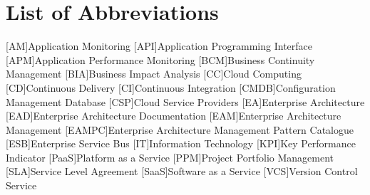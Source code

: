 
\chapter*{List of Abbreviations}

\begin{acronym}[ewuifbwejkbfjksbjkcbsdjcjkn3j]%
[AM]{Application Monitoring}
[API]{Application Programming Interface}
[APM]{Application Performance Monitoring}
[BCM]{Business Continuity Management}
[BIA]{Business Impact Analysis}
[CC]{Cloud Computing}
[CD]{Continuous Delivery}
[CI]{Continuous Integration}
[CMDB]{Configuration Management Database}
[CSP]{Cloud Service Providers}
[EA]{Enterprise Architecture}
[EAD]{Enterprise Architecture Documentation}
[EAM]{Enterprise Architecture Management}
[EAMPC]{Enterprise Architecture Management Pattern Catalogue}
[ESB]{Enterprise Service Bus}
[IT]{Information Technology}
[KPI]{Key Performance Indicator}
[PaaS]{Platform as a Service}
[PPM]{Project Portfolio Management}
[SLA]{Service Level Agreement}
[SaaS]{Software as a Service}
[VCS]{Version Control Service}

%


\end{acronym}